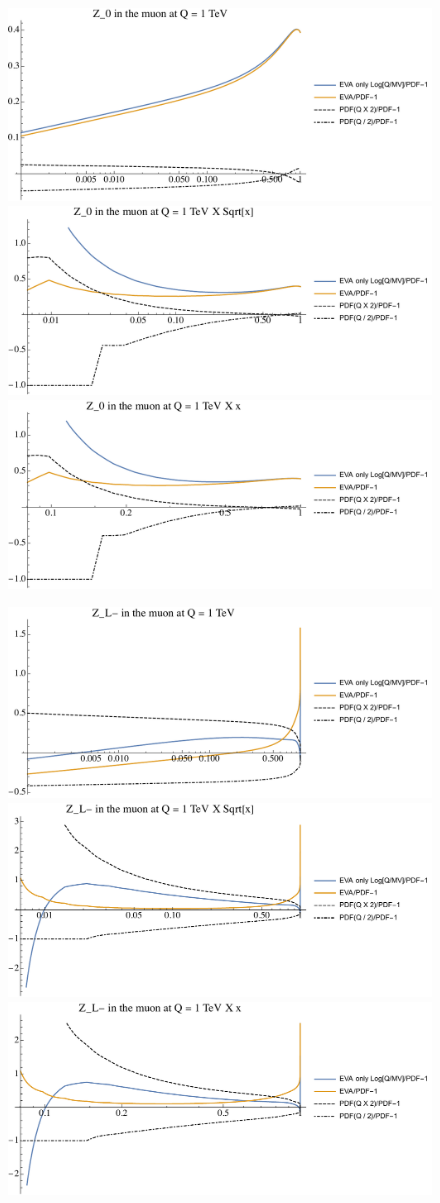 \documentclass[a4paper,11pt]{article}
\begin{document}
\begin{figure}[ht]
\includegraphics[width=0.46\linewidth]{Notebooks/PlotPDFs/ratios/1TeV/Z_0_Q.pdf}
\includegraphics[width=0.46\linewidth]{Notebooks/PlotPDFs/ratios/1TeV/Z_0_Qsqrtx.pdf}
\includegraphics[width=0.46\linewidth]{Notebooks/PlotPDFs/ratios/1TeV/Z_0_Qx.pdf}
\end{figure}

\begin{figure}[ht]
\includegraphics[width=0.46\linewidth]{Notebooks/PlotPDFs/ratios/1TeV/Z_L-_Q.pdf}
\includegraphics[width=0.46\linewidth]{Notebooks/PlotPDFs/ratios/1TeV/Z_L-_Qsqrtx.pdf}
\includegraphics[width=0.46\linewidth]{Notebooks/PlotPDFs/ratios/1TeV/Z_L-_Qx.pdf}
\end{figure}
\end{document}
